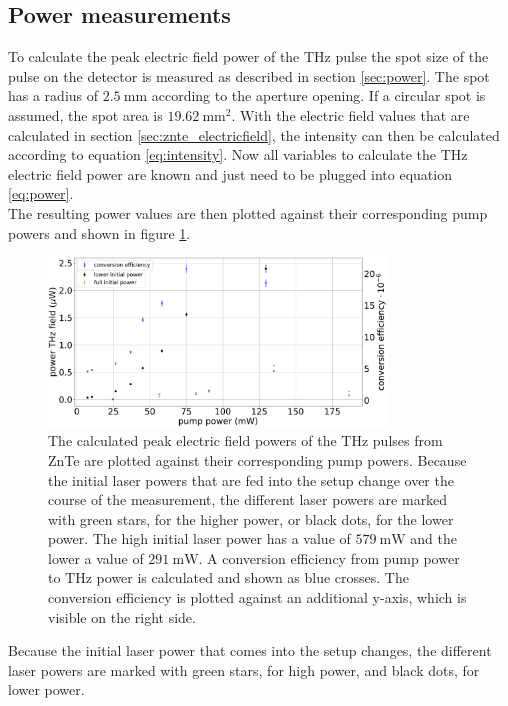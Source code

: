 \subsection{Power measurements}
\FloatBarrier
To calculate the peak electric field power of the $\si{\tera\hertz}$ pulse the spot size of the pulse on the detector is measured as described in section \ref{sec:power}.
The spot has a radius of $\SI{2.5}{\milli\meter}$ according to the aperture opening.
If a circular spot is assumed, the spot area is $\SI{19.62}{\milli\meter\squared}$.
With the electric field values that are calculated in section \ref{sec:znte_electricfield}, the intensity can then be calculated according to equation \eqref{eq:intensity}.
Now all variables to calculate the $\si{\tera\hertz}$ electric field power are known and just need to be plugged into equation \eqref{eq:power}.
\\
The resulting power values are then plotted against their corresponding pump powers and shown in figure \ref{fig:znte_power}.\FloatBarrier
\begin{figure}
    \centering
    \includegraphics[width=0.8\textwidth]{Plots/Powerznte.pdf}
    \caption{The calculated peak electric field powers of the $\si{\tera\hertz}$ pulses from ZnTe are plotted against their corresponding pump powers.
    Because the initial laser powers that are fed into the setup change over the course of the measurement, the different laser powers are marked with green stars, for the higher power, or black dots, for the lower power.
    The high initial laser power has a value of $\SI{579}{\milli\W}$ and the lower a value of $\SI{291}{\milli\W}$.
    A conversion efficiency from pump power to $\si{\tera\hertz}$ power is calculated and shown as blue crosses. 
    The conversion efficiency is plotted against an additional y-axis, which is visible on the right side.}
    \label{fig:znte_power}
\end{figure}\FloatBarrier
Because the initial laser power that comes into the setup changes, the different laser powers are marked with green stars, for high power, and black dots, for lower power.
